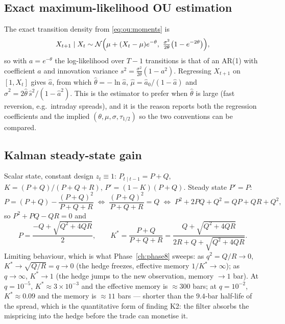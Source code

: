 \subsection{Exact maximum-likelihood OU estimation}
\label{sec:der:oux}

The exact transition density from \eqref{eq:ou:moments} is
\[
  X_{t+1}\mid X_t \sim \mathcal N\Bigl(\mu+(X_t-\mu)e^{-\theta},\
  \tfrac{\sigma^2}{2\theta}\bigl(1-e^{-2\theta}\bigr)\Bigr),
\]
so with $a=e^{-\theta}$ the log-likelihood over $T-1$ transitions is that of an AR(1) with
coefficient $a$ and innovation variance $s^2=\frac{\sigma^2}{2\theta}(1-a^2)$. Regressing
$X_{t+1}$ on $[1,X_t]$ gives $\hat a$, from which
$\hat\theta=-\ln\hat a$, $\hat\mu=\hat a_0/(1-\hat a)$ and
$\hat\sigma^2 = 2\hat\theta\,\hat s^2/(1-\hat a^2)$. This is the estimator to prefer when
$\hat\theta$ is large (fast reversion, e.g.\ intraday spreads), and it is the reason
\code{statkit.ou} reports both the regression coefficients and the implied
$(\theta,\mu,\sigma,\tau_{1/2})$ so the two conventions can be compared.

\subsection{Kalman steady-state gain}
\label{sec:der:kalman}

Scalar state, constant design $z_t\equiv1$: $P_{t\mid t-1}=P+Q$,
$K=(P+Q)/(P+Q+R)$, $P'=(1-K)(P+Q)$. Steady state $P'=P$:
\[
  P = (P+Q) - \frac{(P+Q)^2}{P+Q+R}
  \;\Longleftrightarrow\;
  \frac{(P+Q)^2}{P+Q+R} = Q
  \;\Longleftrightarrow\;
  P^2 + 2PQ + Q^2 = QP + QR + Q^2 ,
\]
so $P^2 + PQ - QR = 0$ and
\begin{equation}
  P = \frac{-Q + \sqrt{Q^2+4QR}}{2},
  \qquad
  K^\ast = \frac{P+Q}{P+Q+R} = \frac{Q+\sqrt{Q^2+4QR}}{2R+Q+\sqrt{Q^2+4QR}} .
  \label{eq:kalmansteadystate}
\end{equation}
Limiting behaviour, which is what Phase~\ref{ch:phase8} sweeps: as $q^2=Q/R\to0$,
$K^\ast\to\sqrt{Q/R}=q\to0$ (the hedge freezes, effective memory $1/K^\ast\to\infty$); as
$q\to\infty$, $K^\ast\to1$ (the hedge jumps to the new observation, memory $\to1$ bar). At
$q=10^{-5}$, $K^\ast\approx3\times10^{-3}$ and the effective memory is $\approx300$ bars;
at $q=10^{-2}$, $K^\ast\approx0.09$ and the memory is $\approx11$ bars --- shorter than the
$9.4$-bar half-life of the spread, which is the quantitative form of finding K2: the filter
absorbs the mispricing into the hedge before the trade can monetise it.

